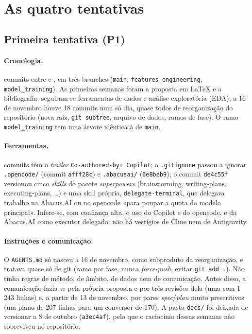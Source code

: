\documentclass[11pt,a4paper]{article}
\newcommand{\Pum}{\textbf{P1}}
\begin{document}
\section{As quatro tentativas}\label{sec:tentativas}

\subsection{Primeira tentativa (\Pum)}

\paragraph{Cronologia.} \mUmCommits{} commits entre \mUmPrimeiro{} e \mUmUltimo{}, em
três branches (\texttt{main}, \texttt{features\_\allowbreak engineering}, \texttt{model\_\allowbreak training}). As
primeiras semanas foram a proposta em LaTeX e a bibliografia; seguiram-se ferramentas de dados e
análise exploratória (EDA); a 16 de novembro houve 18 commits num só dia, quase todos de
reorganização do repositório (nova raiz, \texttt{git subtree}, arquivo de dados, ramos de fase).
O ramo \texttt{model\_training} tem uma árvore idêntica à de \texttt{main}.

\paragraph{Ferramentas.} \mUmCoAutorCopilot{} commits têm o \emph{trailer}
\texttt{Co-authored-by: Copilot}; o \texttt{.gitignore} passou a ignorar \texttt{.opencode/}
(commit \texttt{afff28c}) e \texttt{.abacusai/} (\texttt{6e8beb9}); o commit \texttt{de4c55f}
versionou cinco \emph{skills} do pacote \emph{superpowers} (brainstorming, writing-plans,
executing-plans, \dots) e uma skill própria, \texttt{delegate-terminal}, que delegava trabalho na
Abacus.AI ou no opencode «para poupar a quota do modelo principal». Infere-se, com confiança alta,
o uso do Copilot e do opencode, e da Abacus.AI como executor delegado; não há vestígios de Cline
nem de Antigravity.

\paragraph{Instruções e comunicação.} O \texttt{AGENTS.md} só nasceu a 16 de novembro,
como subproduto da reorganização, e tratava quase só de git (ramo por fase, nunca
\emph{force-push}, evitar \texttt{git add .}). Não tinha regras de método, de âmbito, de dados
nem de comunicação. Antes disso, a comunicação fazia-se pela própria proposta e por três
revisões dela (uma com 1\,243 linhas) e, a partir de 13 de novembro, por pares
\emph{spec}/\emph{plan} muito prescritivos (um plano de 207 linhas para um conversor de 170).
A pasta \texttt{docs/} foi deixada de versionar a 8 de outubro (\texttt{a3ec4af}), pelo que o
raciocínio dessas semanas não sobreviveu no repositório.
\end{document}
